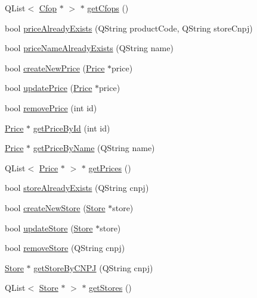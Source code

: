 \begin{DoxyCompactItemize}
\item 
\-Q\-List$<$ \hyperlink{class_cfop}{\-Cfop} $\ast$ $>$ $\ast$ \hyperlink{class_database_controller_a38c3b74cbaad4394c402a33aa1d787fd}{get\-Cfops} ()
\item 
bool \hyperlink{class_database_controller_a095ef9a6e7ee6144305e0e9ecff3bd11}{price\-Already\-Exists} (\-Q\-String product\-Code, \-Q\-String store\-Cnpj)
\item 
bool \hyperlink{class_database_controller_ad565afaed244bca1b8bce14aa9ad56b8}{price\-Name\-Already\-Exists} (\-Q\-String name)
\item 
bool \hyperlink{class_database_controller_ab62daba7d86d94d34e30350a22808199}{create\-New\-Price} (\hyperlink{class_price}{\-Price} $\ast$price)
\item 
bool \hyperlink{class_database_controller_aa095a494ed6be37b294fb813cee905c5}{update\-Price} (\hyperlink{class_price}{\-Price} $\ast$price)
\item 
bool \hyperlink{class_database_controller_a827f4fa829550a150511cc135534150d}{remove\-Price} (int id)
\item 
\hyperlink{class_price}{\-Price} $\ast$ \hyperlink{class_database_controller_a32192b0edeea17ef7697dc4c651d4797}{get\-Price\-By\-Id} (int id)
\item 
\hyperlink{class_price}{\-Price} $\ast$ \hyperlink{class_database_controller_a684a5e27222954a049486e0920efac43}{get\-Price\-By\-Name} (\-Q\-String name)
\item 
\-Q\-List$<$ \hyperlink{class_price}{\-Price} $\ast$ $>$ $\ast$ \hyperlink{class_database_controller_aa337a2b4584aa7075062ed2c3b228368}{get\-Prices} ()
\item 
bool \hyperlink{class_database_controller_a245f62a19f0781a5dcdcc6fd8ca0b758}{store\-Already\-Exists} (\-Q\-String cnpj)
\item 
bool \hyperlink{class_database_controller_a3049c420c83a5c7917e929a2f7e77174}{create\-New\-Store} (\hyperlink{class_store}{\-Store} $\ast$store)
\item 
bool \hyperlink{class_database_controller_a9ad06463ea90c1e89914a73dc678d5dc}{update\-Store} (\hyperlink{class_store}{\-Store} $\ast$store)
\item 
bool \hyperlink{class_database_controller_a0d1b5746b43a69f7579c6b36fcbe8da1}{remove\-Store} (\-Q\-String cnpj)
\item 
\hyperlink{class_store}{\-Store} $\ast$ \hyperlink{class_database_controller_ad7f3a9f62b39d9fe169ed75164d135f7}{get\-Store\-By\-C\-N\-P\-J} (\-Q\-String cnpj)
\item 
\-Q\-List$<$ \hyperlink{class_store}{\-Store} $\ast$ $>$ $\ast$ \hyperlink{class_database_controller_aebafb03238320dd3374924ff60784df3}{get\-Stores} ()
\end{DoxyCompactItemize}
